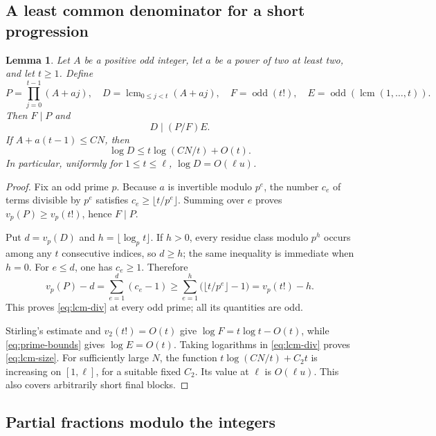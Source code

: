 \documentclass[11pt]{article}
\numberwithin{equation}{section}
\newtheorem{lemma}[theorem]{Lemma}
\theoremstyle{definition}
\newcommand{\odd}{\operatorname{odd}}
\newcommand{\lcm}{\operatorname{lcm}}
\begin{document}
\subsection{A least common denominator for a short progression}

\begin{lemma}\label{lem:lcm}
Let $A$ be a positive odd integer, let $a$ be a power of two at
least two, and let $t\ge1$. Define
\[
 P=\prod_{j=0}^{t-1}(A+aj),\quad
 D=\lcm_{0\le j<t}(A+aj),\quad
 F=\odd(t!),\quad E=\odd(\lcm(1,\ldots,t)).
\]
Then $F\mid P$ and
\begin{equation}\label{eq:lcm-div}
 D\mid (P/F)E.
\end{equation}
If $A+a(t-1)\le CN$, then
\begin{equation}\label{eq:lcm-size}
 \log D\le t\log(CN/t)+O(t).
\end{equation}
In particular, uniformly for $1\le t\le\ell$,
$\log D=O(\ell u)$.
\end{lemma}

\begin{proof}
Fix an odd prime $p$. Because $a$ is invertible modulo $p^e$, the
number $c_e$ of terms divisible by $p^e$ satisfies
$c_e\ge\lfloor t/p^e\rfloor$. Summing over $e$ proves
$v_p(P)\ge v_p(t!)$, hence $F\mid P$.

Put $d=v_p(D)$ and $h=\lfloor\log_p t\rfloor$. If $h>0$,
every residue class modulo $p^h$ occurs among any $t$ consecutive
indices, so $d\ge h$; the same inequality is immediate when $h=0$.
For $e\le d$, one has $c_e\ge1$. Therefore
\[
 v_p(P)-d=\sum_{e=1}^{d}(c_e-1)
 \ge \sum_{e=1}^{h}\bigl(\lfloor t/p^e\rfloor-1\bigr)
 =v_p(t!)-h.
\]
This proves \eqref{eq:lcm-div} at every odd prime; all its
quantities are odd.

Stirling's estimate and $v_2(t!)=O(t)$ give
$\log F=t\log t-O(t)$, while \eqref{eq:prime-bounds} gives
$\log E=O(t)$. Taking logarithms in \eqref{eq:lcm-div}
proves \eqref{eq:lcm-size}. For sufficiently large $N$, the
function $t\log(CN/t)+C_2t$ is increasing on $[1,\ell]$,
for a suitable fixed $C_2$. Its value at $\ell$ is $O(\ell u)$.
This also covers arbitrarily short final blocks.
\end{proof}

\subsection{Partial fractions modulo the integers}
\end{document}
